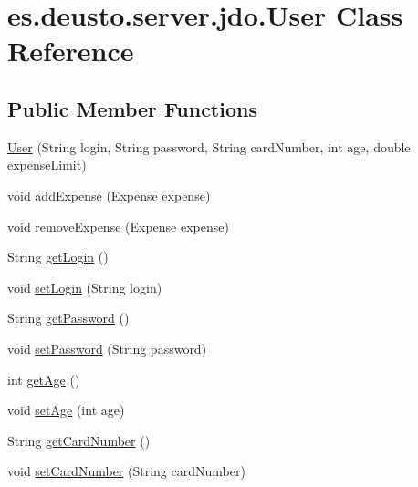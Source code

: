 \hypertarget{classes_1_1deusto_1_1server_1_1jdo_1_1_user}{}\section{es.\+deusto.\+server.\+jdo.\+User Class Reference}
\label{classes_1_1deusto_1_1server_1_1jdo_1_1_user}
\subsection*{Public Member Functions}
\begin{DoxyCompactItemize}
\item 
\hyperlink{classes_1_1deusto_1_1server_1_1jdo_1_1_user_ae35fdda3d2752485c075bc12679a917a}{User} (String login, String password, String card\+Number, int age, double expense\+Limit)
\item 
void \hyperlink{classes_1_1deusto_1_1server_1_1jdo_1_1_user_a8a3a248ef33c0833a482d95150dde9df}{add\+Expense} (\hyperlink{classes_1_1deusto_1_1server_1_1jdo_1_1_expense}{Expense} expense)
\item 
void \hyperlink{classes_1_1deusto_1_1server_1_1jdo_1_1_user_a2ecb8023580fdee24c3f6d6a28b23a86}{remove\+Expense} (\hyperlink{classes_1_1deusto_1_1server_1_1jdo_1_1_expense}{Expense} expense)
\item 
String \hyperlink{classes_1_1deusto_1_1server_1_1jdo_1_1_user_aad8107ea8f9281199377f705d541bf8e}{get\+Login} ()
\item 
void \hyperlink{classes_1_1deusto_1_1server_1_1jdo_1_1_user_a46efd811e38a1196322d0ddf6809c70b}{set\+Login} (String login)
\item 
String \hyperlink{classes_1_1deusto_1_1server_1_1jdo_1_1_user_a1900ee126da22ed0f043e0077e8be049}{get\+Password} ()
\item 
void \hyperlink{classes_1_1deusto_1_1server_1_1jdo_1_1_user_a2e052b5a7cab949f61580edf44bbd233}{set\+Password} (String password)
\item 
int \hyperlink{classes_1_1deusto_1_1server_1_1jdo_1_1_user_a4756305bae572130c76f8d152702d223}{get\+Age} ()
\item 
void \hyperlink{classes_1_1deusto_1_1server_1_1jdo_1_1_user_adc28a24f0a24c86ca31b10d8ffb23232}{set\+Age} (int age)
\item 
String \hyperlink{classes_1_1deusto_1_1server_1_1jdo_1_1_user_a6bbcffd72c92af51ba68625d9468b2a0}{get\+Card\+Number} ()
\item 
void \hyperlink{classes_1_1deusto_1_1server_1_1jdo_1_1_user_a5d9f161786d9f77554530b3538629808}{set\+Card\+Number} (String card\+Number)

\end{DoxyCompactItemize}
